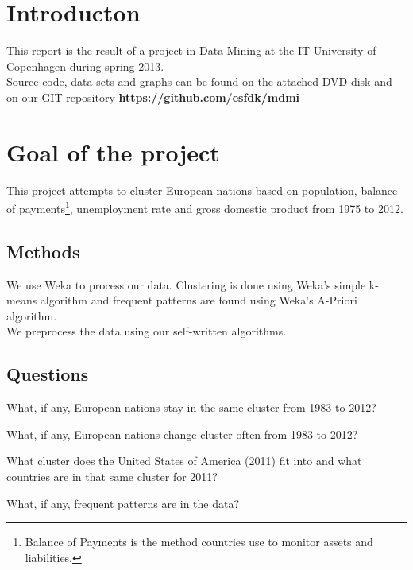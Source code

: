 \section{Introducton}
\label{Intro}
This report is the result of a project in Data Mining at the IT-University of Copenhagen during spring 2013.
\\Source code, data sets and graphs can be found on the attached DVD-disk and on our GIT repository \textbf{https://github.com/esfdk/mdmi}

\section{Goal of the project}
This project attempts to cluster European nations based on population, balance of payments\footnote{Balance of Payments is the method countries use to monitor assets and liabilities.\cite[What Is Balance Of Payments?]{Investopedia}}, unemployment rate and gross domestic product from 1975 to 2012.

\subsection{Methods}
We use Weka to process our data. Clustering is done using Weka's simple k-means algorithm and frequent patterns are found using Weka's A-Priori algorithm.
\\We preprocess the data using our self-written algorithms.

\subsection{Questions}
\label{Intro_que}
\begin{my_itemize}
\item What, if any, European nations stay in the same cluster from 1983 to 2012?
\item What, if any, European nations change cluster often from 1983 to 2012?
\item What cluster does the United States of America (2011) fit into and what countries are in that same cluster for 2011?
\item What, if any, frequent patterns are in the data?
\end{my_itemize}